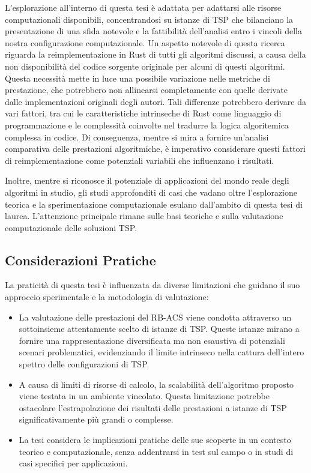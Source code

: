 L'esplorazione all'interno di questa tesi è adattata per adattarsi alle risorse computazionali disponibili, concentrandosi su istanze di \gls{TSP} che bilanciano la presentazione di una sfida notevole e la fattibilità dell'analisi entro i vincoli della nostra configurazione computazionale. Un aspetto notevole di questa ricerca riguarda la reimplementazione in Rust di tutti gli algoritmi discussi, a causa della non disponibilità del codice sorgente originale per alcuni di questi algoritmi. Questa necessità mette in luce una possibile variazione nelle metriche di prestazione, che potrebbero non allinearsi completamente con quelle derivate dalle implementazioni originali degli autori. Tali differenze potrebbero derivare da vari fattori, tra cui le caratteristiche intrinseche di Rust come linguaggio di programmazione e le complessità coinvolte nel tradurre la logica algoritemica complessa in codice. Di conseguenza, mentre si mira a fornire un'analisi comparativa delle prestazioni algoritmiche, è imperativo considerare questi fattori di reimplementazione come potenziali variabili che influenzano i risultati.

Inoltre, mentre si riconosce il potenziale di applicazioni del mondo reale degli algoritmi in studio, gli studi approfonditi di casi che vadano oltre l'esplorazione teorica e la sperimentazione computazionale esulano dall'ambito di questa tesi di laurea. L'attenzione principale rimane sulle basi teoriche e sulla valutazione computazionale delle soluzioni \gls{TSP}.

\subsection{Considerazioni Pratiche}

La praticità di questa tesi è influenzata da diverse limitazioni che guidano il suo approccio sperimentale e la metodologia di valutazione:

\begin{itemize}
  \item La valutazione delle prestazioni del \gls{RB-ACS} viene condotta attraverso un sottoinsieme attentamente scelto di istanze di \gls{TSP}.  Queste istanze mirano a fornire una rappresentazione diversificata ma non esaustiva di potenziali scenari problematici, evidenziando il limite intrinseco nella cattura dell'intero spettro delle configurazioni di \gls{TSP}.
	\item A causa di limiti di risorse di calcolo, la scalabilità dell'algoritmo proposto viene testata in un ambiente vincolato. Questa limitazione potrebbe ostacolare l'estrapolazione dei risultati delle prestazioni a istanze di \gls{TSP} significativamente più grandi o complesse.
	\item La tesi considera le implicazioni pratiche delle sue scoperte in un contesto teorico e computazionale, senza addentrarsi in test sul campo o in studi di casi specifici per applicazioni.
\end{itemize}

